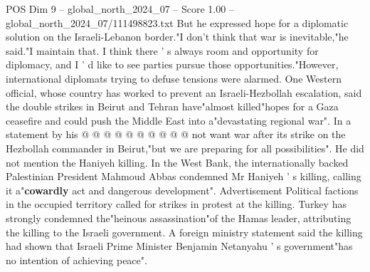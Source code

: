 \begin{textsample}{POS Dim 9 – global\_north\_2024\_07 – Score 1.00 – global\_north\_2024\_07/111498823.txt}
But he expressed hope for a diplomatic solution on the Israeli-Lebanon border."I don't think that war is inevitable,"he said."I maintain that.
I think there ' s always room and opportunity for diplomacy, and I ' d like to see parties pursue those opportunities."However, international diplomats trying to defuse tensions were alarmed.
One Western official, whose country has worked to prevent an Israeli-Hezbollah escalation, said the double strikes in Beirut and Tehran have"almost killed"hopes for a Gaza ceasefire and could push the Middle East into a"devastating regional war".
In a statement by his @ @ @ @ @ @ @ @ @ @ not want war after its strike on the Hezbollah commander in Beirut,"but we are preparing for all possibilities".
He did not mention the Haniyeh killing.
In the West Bank, the internationally backed Palestinian President Mahmoud Abbas condemned Mr Haniyeh ' s killing, calling it a"\textbf{cowardly} act and dangerous development".
Advertisement Political factions in the occupied territory called for strikes in protest at the killing.
Turkey has strongly condemned the"heinous assassination"of the Hamas leader, attributing the killing to the Israeli government.
A foreign ministry statement said the killing had shown that Israeli Prime Minister Benjamin Netanyahu ' s government"has no intention of achieving peace".

\end{textsample}
